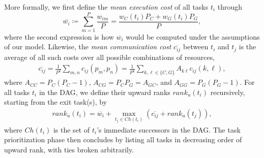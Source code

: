 \documentclass[runningheads]{llncs}
\begin{document}
More formally, we first define the {\em mean execution cost} of all tasks $t_i$ through
\begin{equation}
\label{eq.avg_comp}
\overline{w_i} \coloneqq \sum_{m = 1}^{P} \frac{w_{im}}{P} = \frac{w_C(t_i) P_C + w_G(t_i) P_G}{P},
\end{equation}  
where the second expression is how $\overline{w_i}$ would be computed under the assumptions of our model. Likewise, the {\em mean communication cost} $\overline{c_{ij}}$ between $t_i$ and $t_j$ is the average of all such costs over all possible combinations of resources,
\begin{align}
\label{eq.avg_comm}
\overline{c_{ij}} = \frac{1}{P^2}\sum_{m, n} c_{ij}(p_m, p_n) = \frac{1}{P^2}\sum_{k, \ell \in \{ C, G \}} A_{k\ell} c_{ij}(k, \ell),
\end{align}
where $A_{CC} = P_C(P_C - 1)$, $A_{CG} = P_C P_G = A_{GC}$, and $A_{GG} = P_G(P_G - 1)$. 
For all tasks $t_i$ in the DAG, we define their upward ranks $rank_u(t_i)$ recursively, starting from the exit task(s), by
\begin{align}
\label{eq.upward_rank}
rank_u(t_i) = \overline{w_i} + \max_{t_j \in Ch(t_i)} (\overline{c_{ij}} + rank_u(t_j)),
\end{align}
where $Ch(t_i)$ is the set of $t_i$'s immediate successors in the DAG. The task prioritization phase then concludes by listing all tasks in decreasing order of upward rank, with ties broken arbitrarily. 
\end{document}
